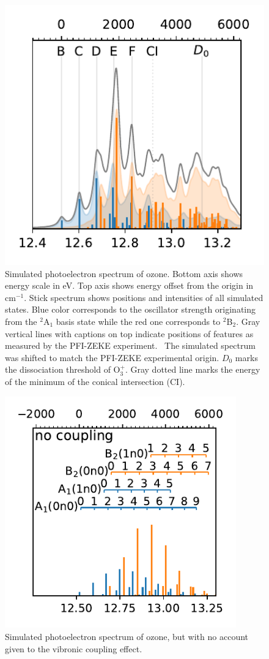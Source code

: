 \documentclass[12pt,a4paper,prb,aps,superscriptaddress]{revtex4}
\begin{document}
\begin{figure}
    \includegraphics[width=10 cm]{figures/spectrum_overline}
    \caption{
        Simulated photoelectron spectrum of ozone. Bottom axis shows energy
        scale in eV. Top axis shows energy offset from the origin in
        cm$^{-1}$. Stick spectrum shows positions and intensities of all
        simulated states. Blue color corresponds to the oscillator strength
        originating from the $^2$A$_1$ basis state while the red one
        corresponds to $^2$B$_2$. Gray vertical lines with captions on top
        indicate positions of features as measured by the PFI-ZEKE
        experiment.~\cite{Willitsch:O3ZEKE:2005} The simulated spectrum was
        shifted to match the PFI-ZEKE experimental origin. $D_0$ marks the
        dissociation threshold of O$_3^+$. Gray dotted line marks the energy
        of the minimum of the conical intersection (CI).
    }
    \label{fig:ozone_overlay}
\end{figure}


\begin{figure}
    \includegraphics[width=10cm]{figures/spectrum_assigned.pdf}
    \caption{
        Simulated photoelectron spectrum of ozone, but with no account given
        to the vibronic coupling effect.
    }
    \label{fig:no_coupling}
\end{figure}
\end{document}
